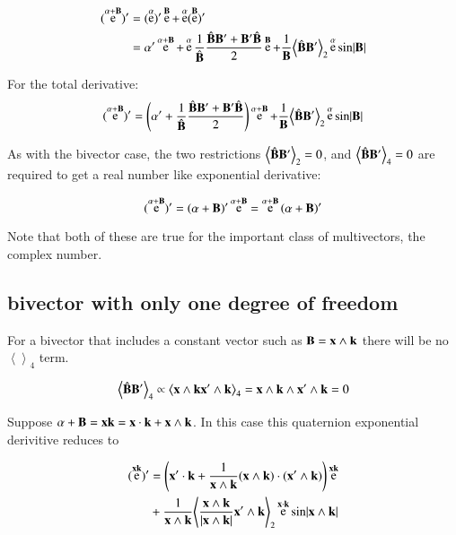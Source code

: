 \documentclass{article}      %
\DeclareMathOperator{\Exp}{e}
\newcommand{\Bcap}[0]{\hat{\BB}}
\newcommand{\Babs}[0]{\abs{\BB}}
\newcommand{\gpgrade}[2] {{\left\langle{{#1}}\right\rangle}_{#2}}
\newcommand{\gpgradetwo}[1] {\gpgrade{#1}{2}}
\newcommand{\gpgradefour}[1] {\gpgrade{#1}{4}}
\begin{document}
\begin{align*}
(\Exp^{\alpha + \BB})' 
&= (\Exp^{\alpha})' \Exp^{\BB} + \Exp^{\alpha} (\Exp^{\BB})' \\
&= \alpha' \Exp^{\alpha + \BB} + \Exp^{\alpha} 
\inv{\Bcap}\frac{\Bcap\BB' + \BB'\Bcap}{2} \Exp^{\BB} + \inv{\BB}\gpgradetwo{\Bcap\BB'} \Exp^{\alpha} \sin\Babs \\
\end{align*}

For the total derivative:
\begin{equation}
(\Exp^{\alpha + \BB})' 
= \left(\alpha' + \inv{\Bcap}\frac{\Bcap\BB' + \BB'\Bcap}{2} \right) \Exp^{\alpha + \BB}
+ \inv{\BB}\gpgradetwo{\Bcap\BB'} \Exp^{\alpha} \sin\Babs
\end{equation}

As with the bivector case, the two restrictions 
$\gpgradetwo{\Bcap\BB'} = 0$, and $\gpgradefour{\Bcap\BB'} = 0$
are required to get a real number like exponential derivative:

\begin{equation}
(\Exp^{\alpha + \BB})' 
= \left(\alpha + \BB\right)' \Exp^{\alpha + \BB}
= \Exp^{\alpha + \BB} \left(\alpha + \BB\right)' 
\end{equation}

Note that both of these are true for the important class of multivectors, the complex number.

\subsection{ bivector with only one degree of freedom }

For a bivector that includes a constant vector such as $\mathbf{B} = \mathbf{x} \wedge \mathbf{k}$ there will be no 
$\gpgradefour{}$ term.

\[
\gpgradefour{\Bcap\BB'}
\propto \gpgradefour{\Bx \wedge \Bk \Bx' \wedge \Bk}
= \Bx \wedge \Bk \wedge \Bx' \wedge \Bk
= 0
\]

Suppose $\alpha + \mathbf{B} = \mathbf{x}\mathbf{k} = \mathbf{x} \cdot \mathbf{k} + \mathbf{x} \wedge \mathbf{k}$.  In this case
this quaternion exponential derivitive reduces to

\begin{align*}
(\Exp^{\Bx\Bk})' 
&= \left(\Bx' \cdot \Bk + \inv{\Bx \wedge \Bk} (\Bx \wedge \Bk) \cdot (\Bx' \wedge \Bk) \right) \Exp^{\Bx\Bk} \\
&+ \inv{\Bx \wedge \Bk}\gpgradetwo{\frac{\Bx \wedge \Bk}{\abs{\Bx \wedge \Bk}}\Bx' \wedge \Bk} \Exp^{\Bx \cdot \Bk} \sin\abs{\Bx \wedge \Bk} \\
\end{align*}
\end{document}
